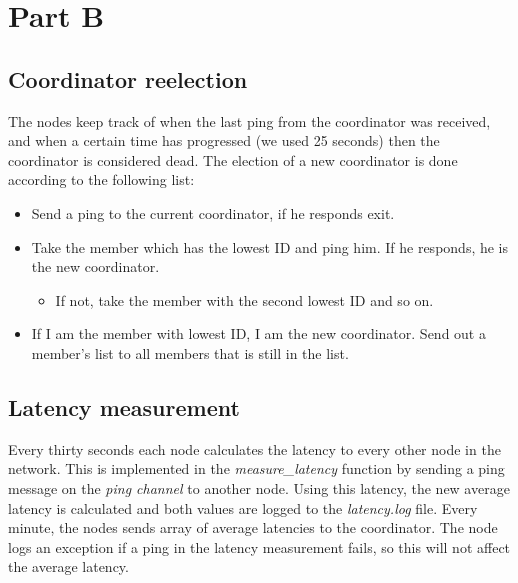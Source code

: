 \documentclass[paper=a4, fontsize=11pt]{scrartcl} %
\numberwithin{equation}{section} %
\numberwithin{figure}{section} %
\numberwithin{table}{section} %
\begin{document}

\section{Part B}


\subsection{Coordinator reelection}
The nodes keep track of when the last ping from the coordinator was received, and when a certain time has progressed (we used 25 seconds) then the coordinator is considered dead. The election of a new coordinator is done according to the following list:
\begin{itemize}
	\item Send a ping to the current coordinator, if he responds exit.
	\item Take the member which has the lowest ID and ping him. If he responds, he is the new coordinator.
	\begin{itemize}
		\item If not, take the member with the second lowest ID and so on.
	\end{itemize}
	\item If I am the member with lowest ID, I am the new coordinator. Send out a member's list to all members that is still in the list.
\end{itemize}


\subsection{Latency measurement}

Every thirty seconds each node calculates the latency to every other node in the network. This is implemented in the \textit{measure\_latency} function by sending a ping message on the \textit{ping channel} to another node. Using this latency, the new average latency is calculated and both values are logged to the \textit{latency.log} file. Every minute, the nodes sends array of average latencies to the coordinator. The node logs an exception if a ping in the latency measurement fails, so this will not affect the average latency.
\end{document}
